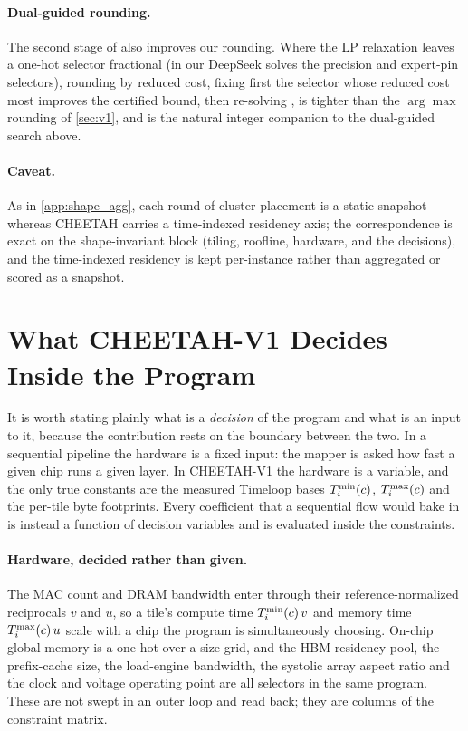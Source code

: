 \paragraph{Dual-guided rounding.}
The second stage of \citet{cvxcluster2026} also improves our rounding. Where the LP
relaxation leaves a one-hot selector fractional (in our DeepSeek solves the
precision and expert-pin selectors), rounding by reduced cost, fixing first the
selector whose reduced cost most improves the certified bound, then re-solving , 
is tighter than the $\arg\max$ rounding of \cref{sec:v1}, and is the natural
integer companion to the dual-guided search above.

\paragraph{Caveat.}
As in \cref{app:shape_agg}, each round of cluster placement is a static snapshot whereas CHEETAH
carries a time-indexed residency axis; the correspondence is exact on the
shape-invariant block (tiling, roofline, hardware, and the decisions), and the
time-indexed residency is kept per-instance rather than aggregated or scored as a
snapshot.

\section{What CHEETAH-V1 Decides Inside the Program}
\label{app:what_v1_decides}

It is worth stating plainly what is a \emph{decision} of the program and what is
an input to it, because the contribution rests on the boundary between the two.
In a sequential pipeline the hardware is a fixed input: the mapper is asked how
fast a given chip runs a given layer. In CHEETAH-V1 the hardware is a variable,
and the only true constants are the measured Timeloop bases $T^{\min}_i(c)$,
$T^{\max}_i(c)$ and the per-tile byte footprints. Every coefficient that a
sequential flow would bake in is instead a function of decision variables and is
evaluated inside the constraints.

\paragraph{Hardware, decided rather than given.}
The MAC count and DRAM bandwidth enter through their reference-normalized
reciprocals $v$ and $u$, so a tile's compute time $T^{\min}_i(c)\,v$ and memory time
$T^{\max}_i(c)\,u$ scale with a chip the program is simultaneously choosing. On-chip
global memory is a one-hot over a size grid, and the HBM residency pool, the
prefix-cache size, the load-engine bandwidth, the systolic array aspect ratio and
the clock and voltage operating point are all selectors in the same program.
These are not swept in an outer loop and read back; they are columns of the
constraint matrix.

